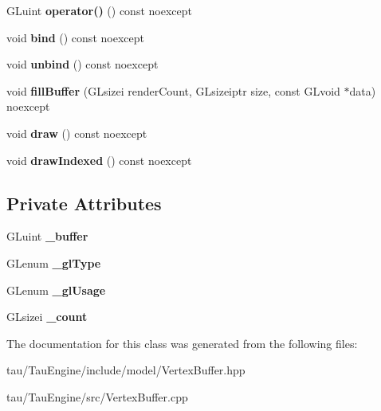 \begin{DoxyCompactItemize}
\mbox{\label{class_vertex_buffer_a0e74785c6764976145ed7125af4e5a4a}} 
G\+Luint {\bfseries operator()} () const noexcept
\item 
\mbox{\label{class_vertex_buffer_a1519dc973966a89ba0b610db995bc1b8}} 
void {\bfseries bind} () const noexcept
\item 
\mbox{\label{class_vertex_buffer_acf3112131a44ac9aed4373d645419f87}} 
void {\bfseries unbind} () const noexcept
\item 
\mbox{\label{class_vertex_buffer_af4b8cc1d7916c13af8878862570d9c60}} 
void {\bfseries fill\+Buffer} (G\+Lsizei render\+Count, G\+Lsizeiptr size, const G\+Lvoid $\ast$data) noexcept
\item 
\mbox{\label{class_vertex_buffer_a174eadbc6352aa0a687849b9896cd3dc}} 
void {\bfseries draw} () const noexcept
\item 
\mbox{\label{class_vertex_buffer_a6efba4482744d25c251fc50ce0d4ccc8}} 
void {\bfseries draw\+Indexed} () const noexcept
\end{DoxyCompactItemize}
\subsection*{Private Attributes}
\begin{DoxyCompactItemize}
\item 
\mbox{\label{class_vertex_buffer_ab3dc262490638b16344c7ecccbba480e}} 
G\+Luint {\bfseries \+\_\+buffer}
\item 
\mbox{\label{class_vertex_buffer_a94e4992940ea5b3d00f57d68af5e7ce1}} 
G\+Lenum {\bfseries \+\_\+gl\+Type}
\item 
\mbox{\label{class_vertex_buffer_a1ea8b72b2ceb7dca13c9c9731b2f57a9}} 
G\+Lenum {\bfseries \+\_\+gl\+Usage}
\item 
\mbox{\label{class_vertex_buffer_ab6bfcb3423bf3ccc3446c2d946030a29}} 
G\+Lsizei {\bfseries \+\_\+count}
\end{DoxyCompactItemize}


The documentation for this class was generated from the following files\+:\begin{DoxyCompactItemize}
\item 
tau/\+Tau\+Engine/include/model/Vertex\+Buffer.\+hpp\item 
tau/\+Tau\+Engine/src/Vertex\+Buffer.\+cpp\end{DoxyCompactItemize}

